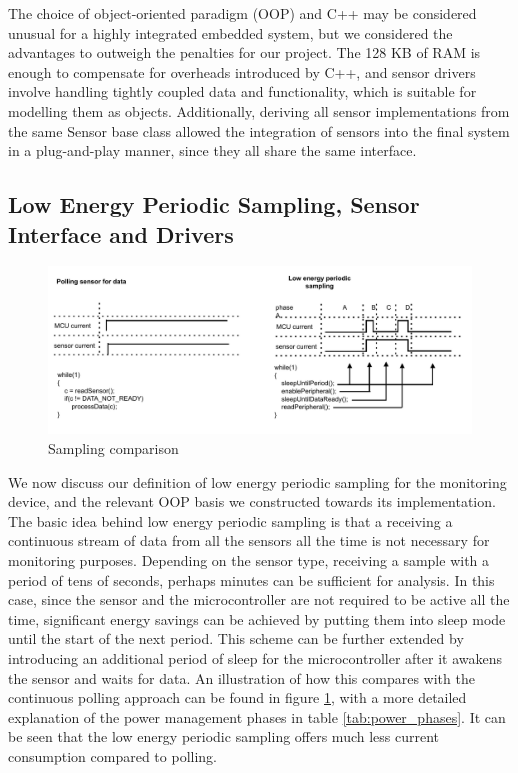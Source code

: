 The choice of object-oriented paradigm (OOP) and C++ may be considered unusual for a highly integrated embedded system, but we considered the advantages to outweigh the penalties for our project. The 128 KB of RAM is enough to compensate for overheads introduced by C++, and sensor drivers involve handling tightly coupled data and functionality, which is suitable for modelling them as objects. Additionally, deriving all sensor implementations from the same Sensor base class allowed the integration of sensors into the final system in a plug-and-play manner, since they all share the same interface.



\subsection{Low Energy Periodic Sampling, Sensor Interface and Drivers}
\label{sec:port_configuration}
\begin{figure}
\centering
\includegraphics[width=\textwidth]{Images/sampling_comparison}
\caption{Sampling comparison}
\label{fig:sampling_comparison}
\end{figure}
We now discuss our definition of low energy periodic sampling for the monitoring device, and the relevant OOP basis we constructed towards its implementation. The basic idea behind low energy periodic sampling is that a receiving a continuous stream of data from all the sensors all the time is not necessary for monitoring purposes. Depending on the sensor type, receiving a sample with a period of tens of seconds, perhaps minutes can be sufficient for analysis. In this case, since the sensor and the microcontroller are not required to be active all the time, significant energy savings can be achieved by putting them into sleep mode until the start of the next period. This scheme can be further extended by introducing an additional period of sleep for the microcontroller after it awakens the sensor and waits for data. An illustration of how this compares with the continuous polling approach can be found in figure \ref{fig:sampling_comparison}, with a more detailed explanation of the power management phases in table \ref{tab:power_phases}. It can be seen that the low energy periodic sampling offers much less current consumption compared to polling.

